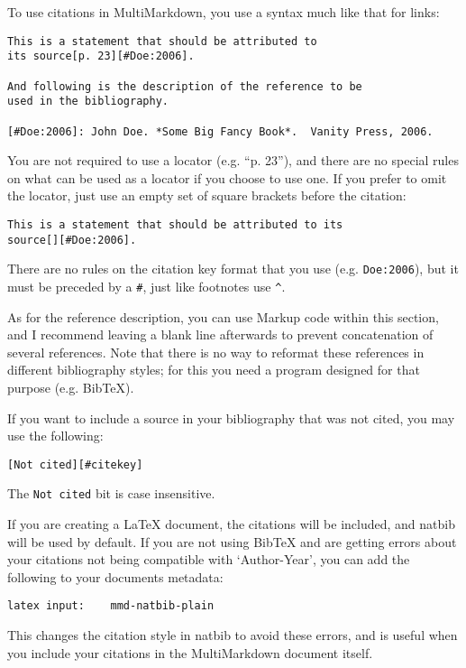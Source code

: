 To use citations in MultiMarkdown, you use a syntax much like that for links:

\begin{verbatim}
This is a statement that should be attributed to
its source[p. 23][#Doe:2006].

And following is the description of the reference to be
used in the bibliography.

[#Doe:2006]: John Doe. *Some Big Fancy Book*.  Vanity Press, 2006.
\end{verbatim}

You are not required to use a locator (e.g. ``p. 23''), and there are no special rules on what can be used as a locator if you choose to use one. If you prefer to omit the locator, just use an empty set of square brackets before the citation:

\begin{verbatim}
This is a statement that should be attributed to its 
source[][#Doe:2006].
\end{verbatim}

There are no rules on the citation key format that you use (e.g. \texttt{Doe:2006}), but it must be preceded by a \texttt{\#}, just like footnotes use \texttt{\^{}}.

As for the reference description, you can use Markup code within this section, and I recommend leaving a blank line afterwards to prevent concatenation of several references. Note that there is no way to reformat these references in different bibliography styles; for this you need a program designed for that purpose (e.g. BibTeX).

If you want to include a source in your bibliography that was not cited, you may use the following:

\begin{verbatim}
[Not cited][#citekey]
\end{verbatim}

The \texttt{Not cited} bit is case insensitive.

If you are creating a LaTeX document, the citations will be included, and natbib will be used by default. If you are not using BibTeX and are getting errors about your citations not being compatible with `Author-Year', you can add the following to your documents metadata:

\begin{verbatim}
latex input:	mmd-natbib-plain
\end{verbatim}

This changes the citation style in natbib to avoid these errors, and is useful when you include your citations in the MultiMarkdown document itself.

